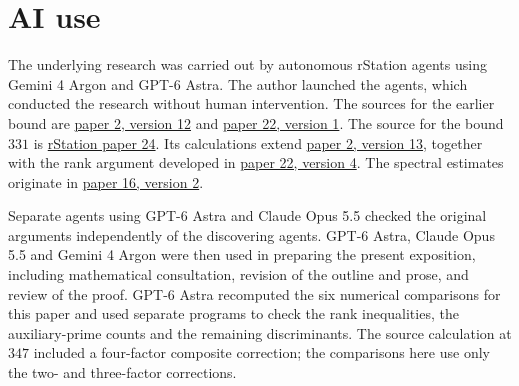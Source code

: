 \section*{AI use}\label{sec:ai-use}
The underlying research was carried out by autonomous rStation agents
using Gemini 4 Argon and GPT-6 Astra. The author launched the agents,
which conducted the research without human intervention. The sources for
the earlier bound are
\href{https://rstation.ai/problems/tenth_discriminant/papers/2/v12}{paper 2,
version 12} and
\href{https://rstation.ai/problems/tenth_discriminant/papers/22/v1}{paper 22,
version 1}. The source for the bound $331$ is
\href{https://rstation.ai/problems/tenth_discriminant/papers/24}{rStation paper 24}.
Its calculations extend
\href{https://rstation.ai/problems/tenth_discriminant/papers/2/v13}{paper 2,
version 13}, together with the rank argument developed in
\href{https://rstation.ai/problems/tenth_discriminant/papers/22/v4}{paper 22,
version 4}. The spectral estimates originate in
\href{https://rstation.ai/problems/tenth_discriminant/papers/16/v2}{paper 16,
version 2}. 

Separate agents using GPT-6 Astra and Claude Opus 5.5 checked the original
arguments independently of the discovering agents. GPT-6 Astra, Claude
Opus 5.5 and Gemini 4 Argon were then used in preparing the present
exposition, including mathematical consultation, revision of the outline
and prose, and review of the proof. GPT-6 Astra recomputed the six numerical comparisons for this paper
and used separate programs to check the rank inequalities, the
auxiliary-prime counts and the remaining discriminants. The source
calculation at $347$ included a four-factor composite correction;
the comparisons here use only the two- and three-factor corrections.
